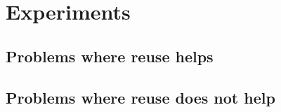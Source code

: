 


\section{Experiments}
\subsection{Problems where reuse helps}

\subsection{Problems where reuse does not help}




